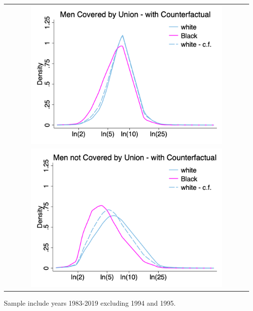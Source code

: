 \documentclass[11pt]{article}
\begin{document}
{\pagebreak
\begin{table}[h!]
    \centering
    \label{fig:dfl_men}
    \begin{tabular}{c}
          \includegraphics[width = 0.8\textwidth, keepaspectratio]{figures/kde1men/fin_cu_bhw_men.png} \\
          \includegraphics[width = 0.8\textwidth, keepaspectratio]{figures/kde1men/fin_cn_bhw_men.png}
    \end{tabular}
\end{table}
\footnotesize{Sample include years 1983-2019 excluding 1994 and 1995.}

}
\end{document}
